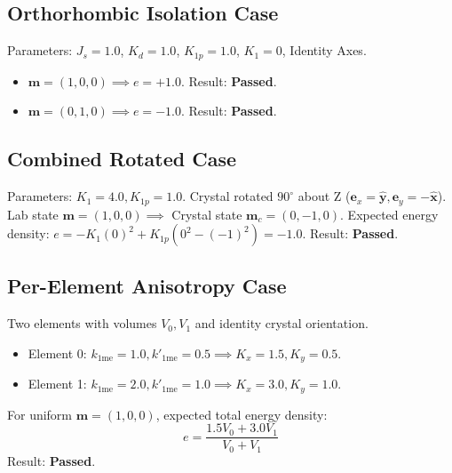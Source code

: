\documentclass[11pt]{article}
\begin{document}
\subsection{Orthorhombic Isolation Case}
Parameters: $J_s=1.0$, $K_d=1.0$, $K_{1p}=1.0$, $K_1=0$, Identity Axes.
\begin{itemize}
    \item $\mathbf{m} = (1,0,0) \implies e = +1.0$. Result: \textbf{Passed}.
    \item $\mathbf{m} = (0,1,0) \implies e = -1.0$. Result: \textbf{Passed}.
\end{itemize}

\subsection{Combined Rotated Case}
Parameters: $K_1=4.0, K_{1p}=1.0$. Crystal rotated $90^\circ$ about Z ($\mathbf{e}_x = \hat{\mathbf{y}}, \mathbf{e}_y = -\hat{\mathbf{x}}$).
Lab state $\mathbf{m} = (1,0,0) \implies$ Crystal state $\mathbf{m}_c = (0, -1, 0)$.
Expected energy density: $e = -K_1(0)^2 + K_{1p}(0^2 - (-1)^2) = -1.0$. Result: \textbf{Passed}.

\subsection{Per-Element Anisotropy Case}
Two elements with volumes $V_0, V_1$ and identity crystal orientation.
\begin{itemize}
    \item Element 0: $k_{1\text{me}}=1.0, k'_{1\text{me}}=0.5 \implies K_x=1.5, K_y=0.5$.
    \item Element 1: $k_{1\text{me}}=2.0, k'_{1\text{me}}=1.0 \implies K_x=3.0, K_y=1.0$.
\end{itemize}
For uniform $\mathbf{m}=(1,0,0)$, expected total energy density:
\begin{equation}
    e = \frac{1.5 V_0 + 3.0 V_1}{V_0 + V_1}
\end{equation}
Result: \textbf{Passed}.
\end{document}
